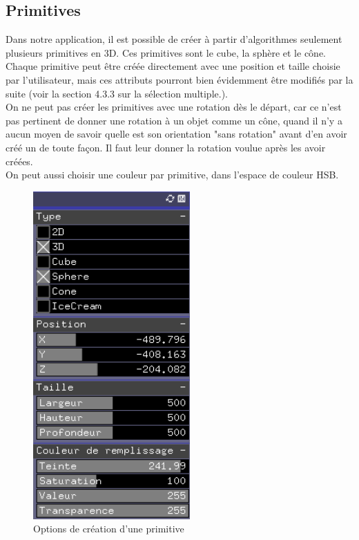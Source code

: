 \newpage

\subsection{Primitives}

Dans notre application, il est possible de créer à partir d'algorithmes seulement plusieurs primitives en 3D. Ces primitives sont le cube, la sphère et le cône. Chaque primitive peut être créée directement avec une position et taille choisie par l'utilisateur, mais ces attributs pourront bien évidemment être modifiés par la suite (voir la section 4.3.3 sur la sélection multiple.).\\

On ne peut pas créer les primitives avec une rotation dès le départ, car ce n'est pas pertinent de donner une rotation à un objet comme un cône, quand il n'y a aucun moyen de savoir quelle est son orientation "sans rotation" avant d'en avoir créé un de toute façon. Il faut leur donner la rotation voulue après les avoir créées.\\

On peut aussi choisir une couleur par primitive, dans l'espace de couleur HSB.

\begin{figure}[h]
	\centering
	\includegraphics[width=6cm]{fig/creationPrimitive.png}
	\caption{Options de création d'une primitive}
	\label{fig:creationPrimitive}
\end{figure}

